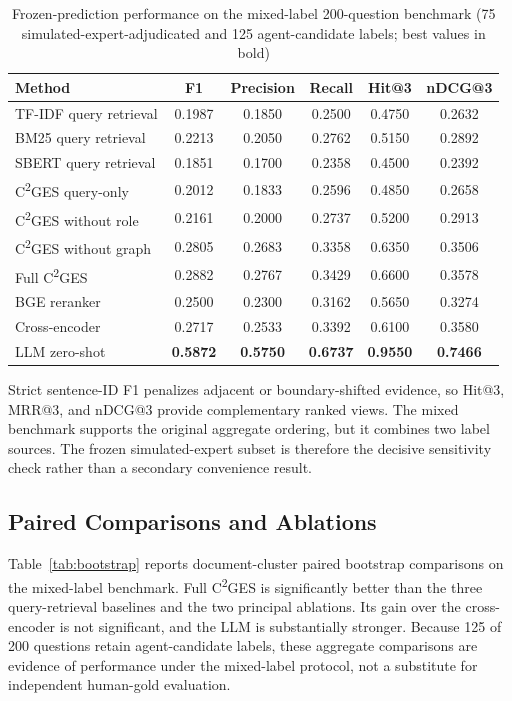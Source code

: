 \documentclass{article}
\begin{document}
\begin{table}[!ht]

\caption{Frozen-prediction performance on the mixed-label 200-question benchmark (75 simulated-expert-adjudicated and 125 agent-candidate labels; best values in bold)}
\label{tab:main_results}
\begin{tabular}{lccccc}
\toprule
\textbf{Method} & \textbf{F1} & \textbf{Precision} & \textbf{Recall} & \textbf{Hit@3} & \textbf{nDCG@3} \\
\midrule
TF-IDF query retrieval & 0.1987 & 0.1850 & 0.2500 & 0.4750 & 0.2632 \\
BM25 query retrieval & 0.2213 & 0.2050 & 0.2762 & 0.5150 & 0.2892 \\
SBERT query retrieval & 0.1851 & 0.1700 & 0.2358 & 0.4500 & 0.2392 \\
C\textsuperscript{2}GES query-only & 0.2012 & 0.1833 & 0.2596 & 0.4850 & 0.2658 \\
C\textsuperscript{2}GES without role & 0.2161 & 0.2000 & 0.2737 & 0.5200 & 0.2913 \\
C\textsuperscript{2}GES without graph & 0.2805 & 0.2683 & 0.3358 & 0.6350 & 0.3506 \\
Full C\textsuperscript{2}GES & 0.2882 & 0.2767 & 0.3429 & 0.6600 & 0.3578 \\
BGE reranker & 0.2500 & 0.2300 & 0.3162 & 0.5650 & 0.3274 \\
Cross-encoder & 0.2717 & 0.2533 & 0.3392 & 0.6100 & 0.3580 \\
LLM zero-shot & \textbf{0.5872} & \textbf{0.5750} & \textbf{0.6737} & \textbf{0.9550} & \textbf{0.7466} \\
\bottomrule
\end{tabular}
\end{table}

Strict sentence-ID F1 penalizes adjacent or boundary-shifted evidence, so Hit@3, MRR@3, and nDCG@3 provide complementary ranked views. The mixed benchmark supports the original aggregate ordering, but it combines two label sources. The frozen simulated-expert subset is therefore the decisive sensitivity check rather than a secondary convenience result.

\subsection{Paired Comparisons and Ablations}
\label{sec:paired_ablations}

Table~\ref{tab:bootstrap} reports document-cluster paired bootstrap comparisons on the mixed-label benchmark. Full C\textsuperscript{2}GES is significantly better than the three query-retrieval baselines and the two principal ablations. Its gain over the cross-encoder is not significant, and the LLM is substantially stronger. Because 125 of 200 questions retain agent-candidate labels, these aggregate comparisons are evidence of performance under the mixed-label protocol, not a substitute for independent human-gold evaluation.
\end{document}
